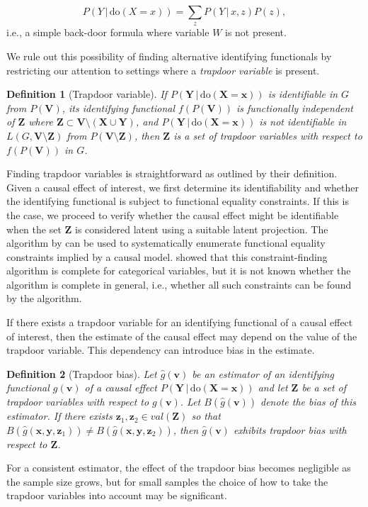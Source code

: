 \documentclass[11pt,a4paper,twoside]{article}
\newtheorem{definition}{Definition}
\newcommand{\+}[1]{\ensuremath{\mathbf{#1}}}
\newcommand{\doo}{\textrm{do}}
\newcommand{\given}{{ \, | \, }}
\newcommand{\z}{trapdoor variable}
\begin{document}
	\begin{equation*} 
	P(Y \given \doo(X = x)) = \sum_{z}P(Y \given x, z)P(z),
	\end{equation*}
	i.e., a simple back-door formula where variable $W$ is not present.

	We rule out this possibility of finding alternative identifying functionals by restricting our attention to settings where a \emph{trapdoor variable} is present.
	\begin{definition}[Trapdoor variable] If ${P(\+ Y \given \doo(\+ X = \+ x))}$ is identifiable in $G$ from $P(\+ V)$, its identifying functional $f(P(\+ V))$ is functionally independent of $\+ Z$ where $\+ Z \subset \+ V \setminus (\+ X \cup \+ Y)$, and $P(\+ Y \given \doo(\+ X = \+ x))$ is not identifiable in $L(G, \+ V \setminus \+ Z)$ from $P(\+ V \setminus \+ Z)$, then $\+ Z$ is a set of \emph{\z s} with respect to $f(P(\+ V))$ in $G$.
	\end{definition}
	Finding \z s is straightforward as outlined by their definition. Given a causal effect of interest, we first determine its identifiability and whether the identifying functional is subject to functional equality constraints. If this is the case, we proceed to verify whether the causal effect might be identifiable when the set $\+ Z$ is considered latent using a suitable latent projection. The algorithm by \citet{TianPearl2002} can be used to systematically enumerate functional equality constraints implied by a causal model. \citet{evans2018} showed that this constraint-finding algorithm is complete for categorical variables, but it is not known whether the algorithm is complete in general, i.e., whether all such constraints can be found by the algorithm.
	
	If there exists a trapdoor variable for an identifying functional of a causal effect of interest, then the estimate of the causal effect may depend on the value of the trapdoor variable. This dependency can introduce bias in the estimate.
	\begin{definition}[Trapdoor bias]
		Let $\hat g(\+ v)$ be an estimator of an identifying functional $g(\+ v)$ of a causal effect $P(\+ Y \given \doo(\+ X  = \+ x))$ and let $\+ Z$ be a set of trapdoor variables with respect to $g(\+ v)$. Let $B(\hat g(\+ v))$ denote the bias of this estimator. If there exists $\+ z_1, \+ z_2 \in val(\+ Z)$ so that $B(\hat g(\+ x,\+ y,\+z_1)) \neq B(\hat g(\+x, \+ y, \+ z_2))$, then $\hat g(\+ v)$ exhibits \emph{trapdoor bias} with respect to $\+ Z$.
	\end{definition}
	For a consistent estimator, the effect of the trapdoor bias becomes negligible as the sample size grows, but for small samples the choice of how to take the trapdoor variables into account may be significant. 
	
\end{document}
